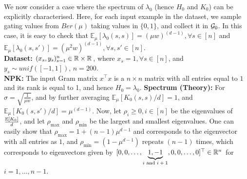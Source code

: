 We now consider a case where the spectrum of $\lambda_0$ (hence $H_0$ and $K_0$) can be explicitly characterised. Here, for each input example in the dataset, we sample gating values from $Ber(\mu)$ taking values in $\{0,1\}$, and collect it in $\mathcal{G}_0$. In this case, it is easy to check that $\mathbb{E}_{\mu}\left[\lambda_0(s,s)\right]=(\mu w)^{(d-1)},\forall s\in[n]$ and $\mathbb{E}_{\mu}\left[\lambda_0(s,s')\right]=(\mu^2 w)^{(d-1)},\forall s,s'\in[n]$.\\
\textbf{Dataset:} $(x_s,y_s)_{s=1}^n\in \mathbb{R}\times \mathbb{R}$, where $x_s=1,\forall s\in [n]$, and $y_s\sim unif([-1,1])$, $n=200$. \\
\textbf{NPK:} The input Gram matrix $x^\top x$ is a $n\times n$ matrix with all entries equal to $1$ and its rank is equal to 1, and hence $H_0=\lambda_0$.\WFclear
\textbf{Spectrum (Theory):} For $\sigma=\sqrt{\frac{1}{\mu w}}$, and by further averaging $\mathbb{E}_{\mu}\left[K_0(s,s)/d\right]=1$, and $\mathbb{E}_{\mu}\left[K_0(s,s')/d\right]=\mu^{(d-1)}$. Now, let $\rho_i\geq 0,i \in [n]$ be the eigenvalues of $\frac{\mathbb{E}\left[K_0\right]}{d}$, and let $\rho_{\max}$ and $\rho_{\min}$ be the largest and smallest eigenvalues. One can easily show that $\rho_{\max}=1+(n-1)\mu^{d-1}$ and corresponds to the eigenvector with all entries as $1$, and $\rho_{\min}=(1-\mu^{d-1})$ repeats $(n-1)$ times, which corresponds to eigenvectors given by $[0, 0, \ldots, \underbrace{1, -1}_{\text{$i$ and $i+1$}}, 0,0,\ldots, 0]^\top \in \mathbb{R}^n$ for $i=1,\ldots,n-1$.\\

